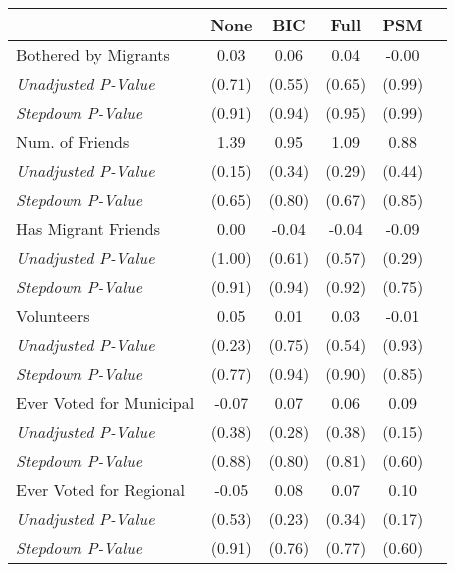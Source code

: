 \begin{tabular}{l c c c c c}
\toprule
 & None & BIC & Full & PSM \\
\midrule
Bothered by Migrants & 0.03 & 0.06 & 0.04 & -0.00 \\
\quad \textit{Unadjusted P-Value} & (0.71) & (0.55) & (0.65) & (0.99) \\
\quad \textit{Stepdown P-Value} & (0.91) & (0.94) & (0.95) & (0.99) \\
Num. of Friends & 1.39 & 0.95 & 1.09 & 0.88 \\
\quad \textit{Unadjusted P-Value} & (0.15) & (0.34) & (0.29) & (0.44) \\
\quad \textit{Stepdown P-Value} & (0.65) & (0.80) & (0.67) & (0.85) \\
Has Migrant Friends & 0.00 & -0.04 & -0.04 & -0.09 \\
\quad \textit{Unadjusted P-Value} & (1.00) & (0.61) & (0.57) & (0.29) \\
\quad \textit{Stepdown P-Value} & (0.91) & (0.94) & (0.92) & (0.75) \\
Volunteers & 0.05 & 0.01 & 0.03 & -0.01 \\
\quad \textit{Unadjusted P-Value} & (0.23) & (0.75) & (0.54) & (0.93) \\
\quad \textit{Stepdown P-Value} & (0.77) & (0.94) & (0.90) & (0.85) \\
Ever Voted for Municipal & -0.07 & 0.07 & 0.06 & 0.09 \\
\quad \textit{Unadjusted P-Value} & (0.38) & (0.28) & (0.38) & (0.15) \\
\quad \textit{Stepdown P-Value} & (0.88) & (0.80) & (0.81) & (0.60) \\
Ever Voted for Regional & -0.05 & 0.08 & 0.07 & 0.10 \\
\quad \textit{Unadjusted P-Value} & (0.53) & (0.23) & (0.34) & (0.17) \\
\quad \textit{Stepdown P-Value} & (0.91) & (0.76) & (0.77) & (0.60) \\
\bottomrule
\end{tabular}

